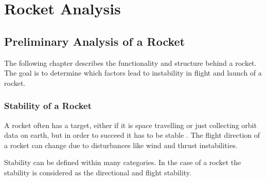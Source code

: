 %
%
%
%


\chapter{Rocket Analysis}

\section{Preliminary Analysis of a Rocket}\label{sec:PRocketAnalysis}
The following chapter describes the functionality and structure behind a rocket. The goal is to determine which factors lead to instability in flight and launch of a rocket. 


\subsection{Stability of a Rocket}
\graphicspath{{figures/"Preanalysis&Requirement"/RocketStability/}}
A rocket often has a target, either if it is space travelling or just collecting orbit data on earth, but in order to succeed it has to be stable \cite{web:rocketnasa}. The flight direction of a rocket can change due to disturbances like wind and thrust instabilities.   

Stability can be defined within many categories. In the case of a rocket the stability is considered as the directional and flight stability.  

